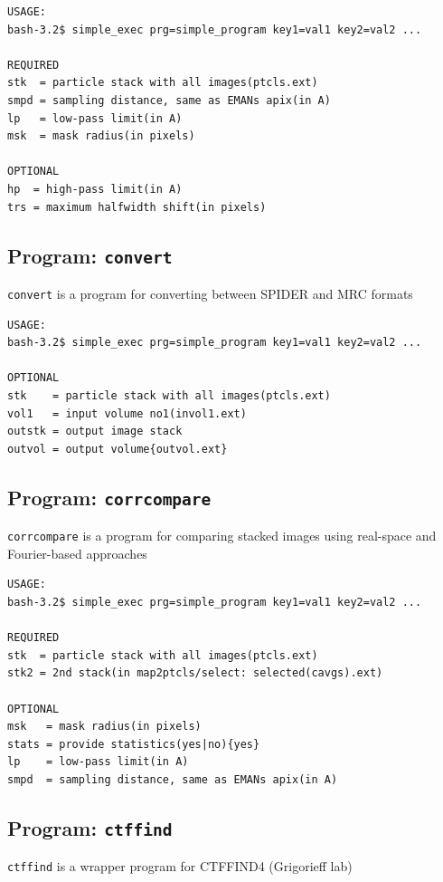 \documentclass[a4paper,11pt]{article}
\newcommand{\prgname}[1]{\textcolor{NavyBlue}{\texttt{#1}}}
\begin{document}
\begin{verbatim}
USAGE:
bash-3.2$ simple_exec prg=simple_program key1=val1 key2=val2 ...

REQUIRED
stk  = particle stack with all images(ptcls.ext)
smpd = sampling distance, same as EMANs apix(in A)
lp   = low-pass limit(in A)
msk  = mask radius(in pixels)

OPTIONAL
hp  = high-pass limit(in A)
trs = maximum halfwidth shift(in pixels)
\end{verbatim}

\subsection{Program: \prgname{convert}}
\label{convert}
\prgname{convert} is a program for converting between SPIDER and MRC formats 

\begin{verbatim}
USAGE:
bash-3.2$ simple_exec prg=simple_program key1=val1 key2=val2 ...

OPTIONAL
stk    = particle stack with all images(ptcls.ext)
vol1   = input volume no1(invol1.ext)
outstk = output image stack
outvol = output volume{outvol.ext}
\end{verbatim}

\subsection{Program: \prgname{corrcompare}}
\label{corrcompare}
\prgname{corrcompare} is a program for comparing stacked images using real-space and Fourier-based approaches 

\begin{verbatim}
USAGE:
bash-3.2$ simple_exec prg=simple_program key1=val1 key2=val2 ...

REQUIRED
stk  = particle stack with all images(ptcls.ext)
stk2 = 2nd stack(in map2ptcls/select: selected(cavgs).ext)

OPTIONAL
msk   = mask radius(in pixels)
stats = provide statistics(yes|no){yes}
lp    = low-pass limit(in A)
smpd  = sampling distance, same as EMANs apix(in A)
\end{verbatim}

\subsection{Program: \prgname{ctffind}}
\label{ctffind}
\prgname{ctffind} is a wrapper program for CTFFIND4 (Grigorieff lab)
\end{document}
